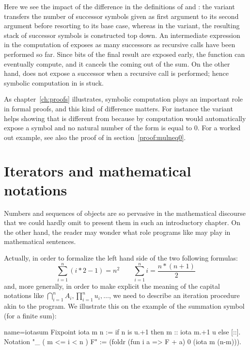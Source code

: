 Here we see the impact of the difference in the definitions of
 and : the  variant transfers the
number of  successor symbols 
given as first argument to its second argument
before resorting to its base case, whereas in the  variant,
the resulting stack of successor symbols is constructed top down. An
intermediate
expression in the computation of  exposes as many
successors as recursive calls have been performed so far. Since bits
of the final result are exposed early, the  function can
eventually compute, and it cancels the  coming out of the sum.
On the other hand,
 does not expose a successor when a recursive call is
performed; hence symbolic computation in  is stuck.

As chapter~\ref{ch:proofs} illustrates, symbolic computation plays an
important role in formal proofs, and this kind of difference
matters. For instance the  variant helps
showing that  is different from  because by
computation \Coq{} would automatically expose  a  symbol
and no natural number of the form  is equal to 0.
For a worked out example, see also the proof of  in
section~\ref{proof:mulneq0}.


\section{Iterators and mathematical notations}
\label{sec:bigopnat}

Numbers and sequences of objects are so pervasive in the mathematical
discourse that we could hardly omit to present them in such an
introductory chapter. On the other hand, the reader may wonder what role
programs like  may play in mathematical sentences.

Actually, in order to formalize the left hand side of the two
following formulas:
$$
\sum_{i=1}^n (i * 2 - 1) = n ^ 2 \qquad
\sum_{i=1}^n i = \frac{n * (n + 1)}{2}
$$
and, more generally, in order to make explicit the meaning of the capital
notations like $\bigcap_{i=1}^nA_i,
\prod_{i=1}^nu_i, \dots$, we need to describe an iteration procedure
akin to the  program. We illustrate this on the example of
the summation symbol (for a finite sum):

\begin{coq}{name=iotasum}{}
Fixpoint iota m n := if n is u.+1 then m :: iota m.+1 u else [::].
Notation "\sum_ ( m <= i < n ) F" :=
  (foldr (fun i a => F + a) 0 (iota m (n-m))).
\end{coq}
\index[coq]{\C{\\sum}}


